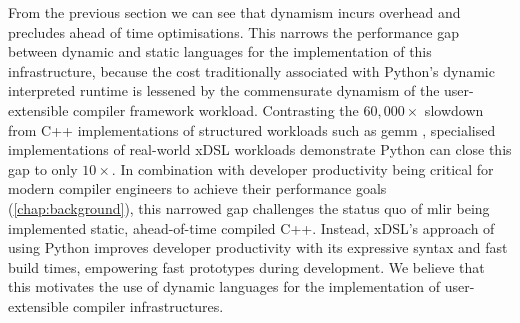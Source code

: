 From the previous section we can see that dynamism incurs overhead and precludes ahead of time optimisations.
This narrows the performance gap between dynamic and static languages for the implementation of this infrastructure, because the cost traditionally associated with Python's dynamic interpreted runtime is lessened by the commensurate dynamism of the user-extensible compiler framework workload. Contrasting the $60,000\times$ slowdown from C++ implementations of structured workloads such as \ac{gemm} \cite{emerybergerPythonPerformanceMatters2022}, specialised implementations of real-world xDSL workloads demonstrate Python can close this gap to only $10\times$.
In combination with developer productivity being critical for modern compiler engineers to achieve their performance goals (\autoref{chap:background}), this narrowed gap challenges the status quo of \ac{mlir} being implemented static, ahead-of-time compiled C++.
Instead, xDSL's approach of using Python improves developer productivity with its expressive syntax and fast build times, empowering fast prototypes during development.
We believe that this motivates the use of dynamic languages for the implementation of user-extensible compiler infrastructures.
